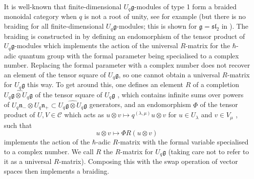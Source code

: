 \documentclass[12pt,dvipsnames]{article}
\numberwithin{equation}{section}
\theoremstyle{definition}
\newcommand{\cat}[1]{\mathcal{#1}}
\newcommand{\1}{\ensuremath{\mathbbm{1}}}
\begin{document}
It is well-known that finite-dimensional $U_q\mathfrak{g}$-modules of type 1 form a braided monoidal category when $q$ is not a root of unity, see for example \cite[Prop.\,8.19]{KS97} (but there is no braiding for all finite-dimensional $U_q\mathfrak{g}$-modules; this is shown for $\mathfrak{g}=\mathfrak{sl}_2$ in \cite{WW26}). The braiding is constructed in \cite[Sec.\,8.3.3]{KS97} by defining an endomorphism of the tensor product of $U_q\mathfrak{g}$-modules which implements the action of the universal $R$-matrix for the $\hbar$-adic quantum group with the formal parameter being specialised to a complex number. Replacing the formal parameter with a complex number does not recover an element of the tensor square of $U_q\mathfrak{g}$, so one cannot obtain a universal $R$-matrix for $U_q\mathfrak{g}$ this way. To get around this, one defines an element $R$ of a completion $\widehat{U_q\mathfrak{g}\otimes U_q\mathfrak{g}}$ of the tensor square of $U_q\mathfrak{g}$ \cite[Thm.\,8.18]{KS97}, which contains infinite sums over powers of $U_q\mathfrak{n}_-\otimes U_q\mathfrak{n}_+\subset\widehat{U_q\mathfrak{g}\otimes U_q\mathfrak{g}}$ generators, and an endomorphism $\Phi$ of the tensor product of $U,V\in\cat{C}$ which acts as $u\otimes v \mapsto q^{(\lambda,\mu)} u\otimes v$ for $u\in U_\lambda$ and $v\in V_\mu$ \cite[Prop.\,8.19]{KS97}, such that
\begin{equation}\label{eq:Uqg braiding}
    u\otimes v \mapsto \Phi R(u\otimes v)
\end{equation}
implements the action of the $\hbar$-adic $R$-matrix with the formal variable specialised to a complex number. We call $R$ the $R$-matrix for $U_q\mathfrak{g}$ (taking care not to refer to it as a universal $R$-matrix). Composing this with the swap operation of vector spaces then implements a braiding.
\end{document}
